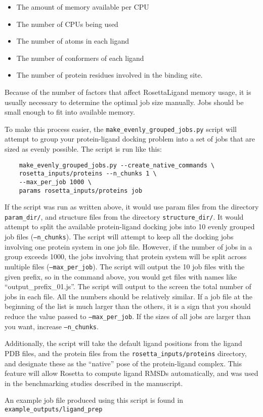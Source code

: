 \begin{enumerate}
	\begin{itemize}
	\itemsep1pt\parskip0pt
	\item
 		The amount of memory available per \ac{CPU}
	\item
    		The number of \ac{CPU}s being used
	\item
 		The number of atoms in each ligand
	\item
		The number of conformers of each ligand
	\item
		The number of protein residues involved in the binding site.
	\end{itemize}

	Because of the number of factors that affect RosettaLigand memory usage, it is usually necessary to determine the optimal job size manually.
	Jobs should be small enough to fit into available memory.

	To make this process easier, the \texttt{make\_evenly\_grouped\_jobs.py} script will attempt to group your protein-ligand docking problem into a set of jobs that are sized as evenly possible.
	The script is run like this:

	\begin{verbatim}
	make_evenly_grouped_jobs.py --create_native_commands \
	rosetta_inputs/proteins --n_chunks 1 \
	--max_per_job 1000 \
	params rosetta_inputs/proteins job
	\end{verbatim}

	If the script was run as written above, it would use param files from the directory \texttt{param\_dir/}, and structure files from the directory \texttt{structure\_dir/}.
	It would attempt to split the available protein-ligand docking jobs into 10 evenly grouped job files (\texttt{--n\_chunks}).
	The script will attempt to keep all the docking jobs involving one protein system in one job file.
	However, if the number of jobs in a group exceeds 1000, the jobs involving that protein system will be split across multiple files (\texttt{--max\_per\_job}). The script will output the 10 job files with the given prefix, so in the command above, you would get files with names like ``output\_prefix\_01.js''.
	The script will output to the screen the total number of jobs in each file. 
	All the numbers should be relatively similar.
	If a job file at the beginning of the list is much larger than the others, it is a sign that you should reduce the value passed to \texttt{--max\_per\_job}. If the sizes of all jobs are larger than you want, increase \texttt{--n\_chunks}.

	Additionally, the script will take the default ligand positions from the ligand \ac{PDB} files, and the protein files from the \texttt{rosetta\_inputs/proteins} directory, and designate these as the ``native'' pose of the protein-ligand complex.
	This feature will allow Rosetta to compute ligand RMSDs automatically, and was used in the benchmarking studies described in the manuscript.

	An example job file produced using this script is found in\\
	\texttt{example\_outputs/ligand\_prep}
\end{enumerate}

